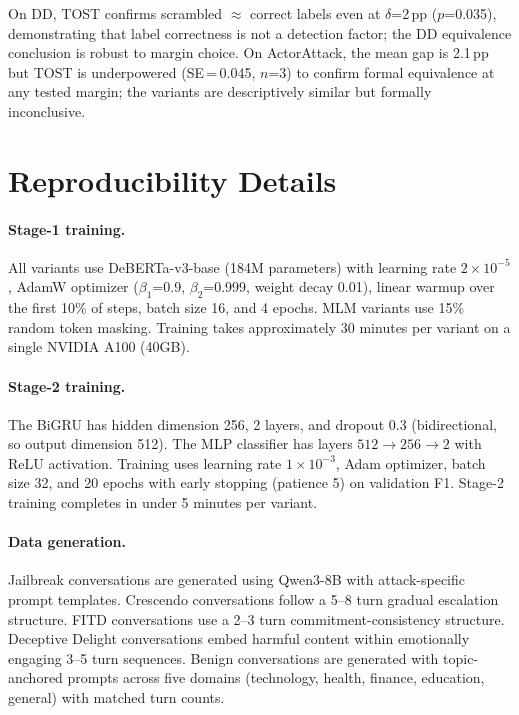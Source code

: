 On DD, TOST confirms scrambled $\approx$ correct labels even at $\delta$=2\,pp ($p$=0.035), demonstrating that label correctness is not a detection factor; the DD equivalence conclusion is robust to margin choice. On ActorAttack, the mean gap is 2.1\,pp but TOST is underpowered (SE\,=\,0.045, $n$=3) to confirm formal equivalence at any tested margin; the variants are descriptively similar but formally inconclusive.

\section{Reproducibility Details}
\label{sec:reproducibility}

\paragraph{Stage-1 training.}
All variants use DeBERTa-v3-base (184M parameters) with learning rate $2 \times 10^{-5}$, AdamW optimizer ($\beta_1$=0.9, $\beta_2$=0.999, weight decay 0.01), linear warmup over the first 10\% of steps, batch size 16, and 4 epochs. MLM variants use 15\% random token masking. Training takes approximately 30 minutes per variant on a single NVIDIA A100 (40GB).

\paragraph{Stage-2 training.}
The BiGRU has hidden dimension 256, 2 layers, and dropout 0.3 (bidirectional, so output dimension 512). The MLP classifier has layers $512 \to 256 \to 2$ with ReLU activation. Training uses learning rate $1 \times 10^{-3}$, Adam optimizer, batch size 32, and 20 epochs with early stopping (patience 5) on validation F1. Stage-2 training completes in under 5 minutes per variant.

\paragraph{Data generation.}
Jailbreak conversations are generated using Qwen3-8B with attack-specific prompt templates. Crescendo conversations follow a 5--8 turn gradual escalation structure. FITD conversations use a 2--3 turn commitment-consistency structure. Deceptive Delight conversations embed harmful content within emotionally engaging 3--5 turn sequences. Benign conversations are generated with topic-anchored prompts across five domains (technology, health, finance, education, general) with matched turn counts.

